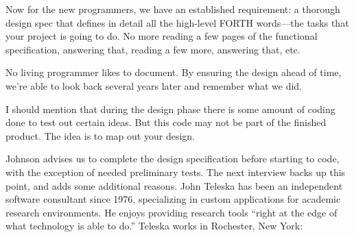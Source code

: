 \begin{tfquot}
Now for the new programmers, we have an established requirement: a
thorough design spec that defines in detail all the high-level FORTH
words---the tasks that your project is going to do. No more reading a
few pages of the functional specification, answering that, reading a
few more, answering that, etc.

No living programmer likes to document. By ensuring the design ahead of
time, we're able to look back several years later and remember what we did.

I should mention that during the design phase there is some amount of
coding done to test out certain ideas. But this code may not be part
of the finished product. The idea is to map out your design.
\end{tfquot}
\blackline{2ex}
Johnson advises us to complete the design specification before starting
to code, with the exception of needed preliminary tests. The next
interview backs up this point, and adds some additional reasons.
\bigskip\blackline{2ex}
\noindent John Teleska has been an independent software consultant
since 1976, specializing in custom applications for academic research
environments.  He enjoys providing research tools ``right at the edge
of what technology is able to do.'' Teleska works in Rochester, New York:

